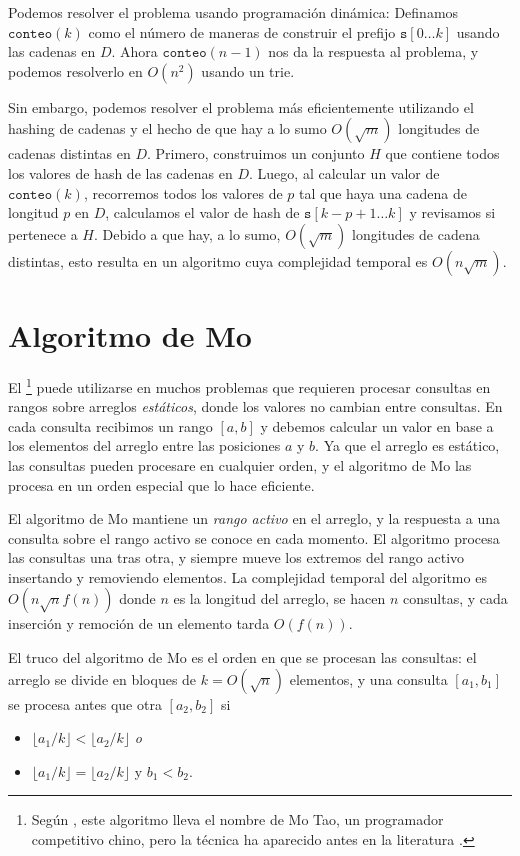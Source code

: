 Podemos resolver el problema usando programación dinámica: Definamos
$\texttt{conteo}(k)$ como el número de maneras de construir el prefijo
$\texttt{s}[0 \ldots k]$ usando las cadenas en $D$. Ahora
$\texttt{conteo}(n-1)$ nos da la respuesta al problema, y podemos resolverlo
en $O(n^2)$ usando un trie.

Sin embargo, podemos resolver el problema más eficientemente utilizando
el hashing de cadenas y el hecho de que hay a lo sumo $O(\sqrt m)$ longitudes
de cadenas distintas en $D$. Primero, construimos un conjunto $H$ que
contiene todos los valores de hash de las cadenas en $D$.
Luego, al calcular un valor de $\texttt{conteo}(k)$, recorremos todos los
valores de $p$ tal que haya una cadena de longitud $p$ en $D$, calculamos
el valor de hash de $\texttt{s}[k-p+1 \ldots k]$ y revisamos si pertenece
a $H$. Debido a que hay, a lo sumo, $O(\sqrt m)$ longitudes de cadena
distintas, esto resulta en un algoritmo cuya complejidad temporal es
$O(n \sqrt m)$.

\section{Algoritmo de Mo}


El \footnote{Según \cite{cod15}, este algoritmo lleva
    el nombre de Mo Tao, un programador competitivo chino, pero la técnica
    ha aparecido antes en la literatura \cite{ken06}.} puede utilizarse en
muchos problemas que requieren procesar consultas en rangos sobre arreglos
\emph{estáticos}, donde los valores no cambian entre consultas.
En cada consulta recibimos un rango $[a,b]$ y debemos calcular un valor en
base a los elementos del arreglo entre las posiciones $a$ y $b$. Ya que el
arreglo es estático, las consultas pueden procesare en cualquier orden, y
el algoritmo de Mo las procesa en un orden especial que lo hace eficiente.

El algoritmo de Mo mantiene un \emph{rango activo} en el arreglo, y la
respuesta a una consulta sobre el rango activo se conoce en cada momento.
El algoritmo procesa las consultas una tras otra, y siempre mueve los
extremos del rango activo insertando y removiendo elementos. La complejidad
temporal del algoritmo es $O(n \sqrt n f(n))$ donde $n$ es la longitud del
arreglo, se hacen $n$ consultas, y cada inserción y remoción de un elemento
tarda $O(f(n))$.

El truco del algoritmo de Mo es el orden en que se procesan las consultas:
el arreglo se divide en bloques de $k=O(\sqrt n)$ elementos, y una consulta
$[a_1,b_1]$ se procesa antes que otra $[a_2,b_2]$ si
\begin{itemize}
    \item $\lfloor a_1/k \rfloor < \lfloor a_2/k \rfloor$ \emph{o}
    \item $\lfloor a_1/k \rfloor = \lfloor a_2/k \rfloor$ y $b_1 < b_2$.
\end{itemize}

